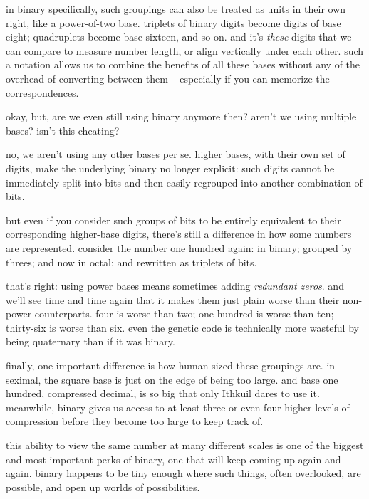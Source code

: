 \documentclass[../best.tex]{subfiles}
\begin{document}
in binary specifically, such groupings can also be treated as units in their own right, like a power-of-two base. triplets of binary digits become digits of base eight; quadruplets become base sixteen, and so on. and it's \emph{these} digits that we can compare to measure number length, or align vertically under each other. such a notation allows us to combine the benefits of all these bases without any of the overhead of converting between them -- especially if you can memorize the correspondences.\myfootnote{}

okay, but, are we even still using binary anymore then? aren't we using multiple bases? isn't this cheating?

no, we aren't using any other bases per se. higher bases, with their own set of digits, make the underlying binary no longer explicit: such digits cannot be immediately split into bits and then easily regrouped into another combination of bits.\myfootnote{}

but even if you consider such groups of bits to be entirely equivalent to their corresponding higher-base digits, there's still a difference in how some numbers are represented. consider the number one hundred again: in binary; grouped by threes; and now in octal; and rewritten as triplets of bits.

that's right: using power bases means sometimes adding \emph{redundant zeros}.\myfootnote{} and we'll see time and time again that it makes them just plain worse than their non-power counterparts. four is worse than two; one hundred is worse than ten; thirty-six is worse than six.\myfootnote{} even the genetic code is technically more wasteful by being quaternary than if it was binary.\myfootnote{}

finally, one important difference is how human-sized these groupings are. in seximal, the square base is just on the edge of being too large. and base one hundred, compressed decimal, is so big that only Ithkuil dares to use it.\myfootnote{} meanwhile, binary gives us access to at least three or even four higher levels of compression before they become too large to keep track of.

this ability to view the same number at many different scales is one of the biggest and most important perks of binary, one that will keep coming up again and again. binary happens to be tiny enough where such things, often overlooked, are possible, and open up worlds of possibilities.
\end{document}
